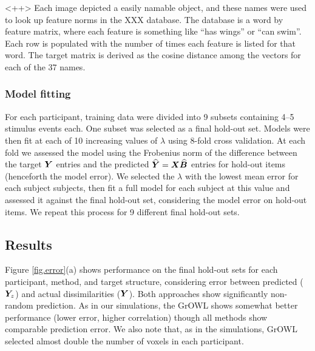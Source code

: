 <++>
Each image depicted a easily namable object, and these names were used to look up feature
norms in the XXX database. The database is a word by feature matrix, where each feature is
something like ``has wings'' or ``can swim''. Each row is populated with the number of
times each feature is listed for that word. The target matrix is derived as the cosine
distance among the vectors for each of the 37 names.

\subsubsection*{Model fitting} For each participant, training data were divided into 9
subsets containing 4--5 stimulus events each. One subset was selected as a final hold-out
set. Models were then fit at each of 10 increasing values of $\lambda$ using 8-fold cross
validation. At each fold we assessed the model using the Frobenius norm of the difference
between the target $\boldsymbol{Y}$ entries and the predicted $\boldsymbol{\widehat{Y}} = \boldsymbol{X}\widehat{\boldsymbol{B}}$ entries for
hold-out items (henceforth the model error). We selected the $\lambda$ with the lowest mean
error for each subject subjects, then fit a full model for each subject at this value and
assessed it against the final hold-out set, considering the model error on hold-out items.
We repeat this process for 9 different final hold-out sets.

\subsection{Results}

Figure \ref{fig.error}(a) shows performance on the final hold-out sets for each
participant, method, and target structure, considering error between predicted ($\boldsymbol{Y}_z$)
and actual dissimilarities ($\boldsymbol{Y}$). Both approaches show significantly non-random
prediction. As in our simulations, the GrOWL shows somewhat better performance (lower
error, higher correlation) though all methods show comparable prediction error. We also
note that, as in the simulations, GrOWL selected almost double the number of voxels in each
participant. 

